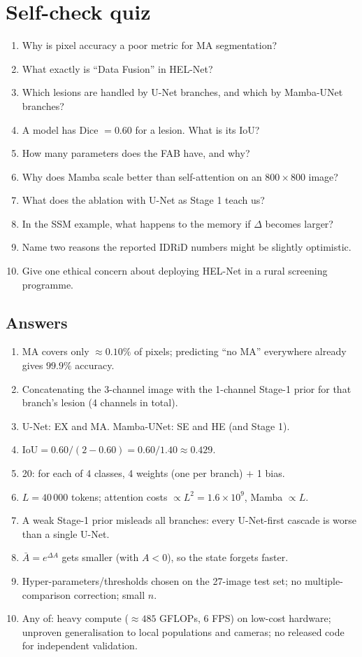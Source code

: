 \documentclass[11pt,a4paper]{article}
\begin{document}
\section{Self-check quiz}
\begin{enumerate}
\item Why is pixel accuracy a poor metric for MA segmentation?
\item What exactly is ``Data Fusion'' in HEL-Net?
\item Which lesions are handled by U-Net branches, and which by Mamba-UNet branches?
\item A model has Dice $=0.60$ for a lesion. What is its IoU?
\item How many parameters does the FAB have, and why?
\item Why does Mamba scale better than self-attention on an $800\times800$ image?
\item What does the ablation with U-Net as Stage 1 teach us?
\item In the SSM example, what happens to the memory if $\Delta$ becomes larger?
\item Name two reasons the reported IDRiD numbers might be slightly optimistic.
\item Give one ethical concern about deploying HEL-Net in a rural screening programme.
\end{enumerate}

\subsection*{Answers}
\begin{enumerate}[label=\textbf{\arabic*.}]
\small
\item MA covers only $\approx0.10\%$ of pixels; predicting ``no MA'' everywhere already gives $99.9\%$ accuracy.
\item Concatenating the 3-channel image with the 1-channel Stage-1 prior for that branch's lesion (4 channels in total).
\item U-Net: EX and MA. Mamba-UNet: SE and HE (and Stage 1).
\item $\text{IoU}=0.60/(2-0.60)=0.60/1.40\approx0.429$.
\item 20: for each of 4 classes, 4 weights (one per branch) $+$ 1 bias.
\item $L=40\,000$ tokens; attention costs $\propto L^2=1.6\times10^9$, Mamba $\propto L$.
\item A weak Stage-1 prior misleads all branches: every U-Net-first cascade is worse than a single U-Net.
\item $\bar A=e^{\Delta A}$ gets smaller (with $A<0$), so the state forgets faster.
\item Hyper-parameters/thresholds chosen on the 27-image test set; no multiple-comparison correction; small $n$.
\item Any of: heavy compute ($\approx485$ GFLOPs, 6 FPS) on low-cost hardware; unproven generalisation to
      local populations and cameras; no released code for independent validation.
\end{enumerate}
\end{document}

